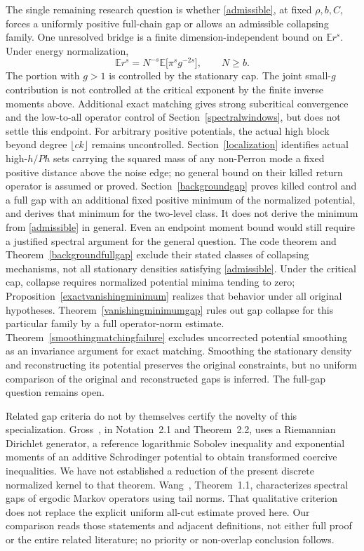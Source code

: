 \documentclass[11pt]{article}
\newcommand{\E}{\mathbb E}
\begin{document}
The single remaining research question is whether \eqref{admissible}, at fixed $\rho,b,C$, forces a uniformly positive full-chain gap or allows an admissible collapsing family. One unresolved bridge is a finite dimension-independent bound on $\E r^s$. Under energy normalization,
\[
 \E r^s=N^{-s}\E\bigl[\pi^s g^{-2s}\bigr],\qquad N\geq b.
\]
The portion with $g>1$ is controlled by the stationary cap. The joint small-$g$ contribution is not controlled at the critical exponent by the finite inverse moments above. Additional exact matching gives strong subcritical convergence and the low-to-all operator control of Section~\ref{spectralwindows}, but does not settle this endpoint. For arbitrary positive potentials, the actual high block beyond degree $\lfloor ck\rfloor$ remains uncontrolled. Section~\ref{localization} identifies actual high-$h/Ph$ sets carrying the squared mass of any non-Perron mode a fixed positive distance above the noise edge; no general bound on their killed return operator is assumed or proved. Section~\ref{backgroundgap} proves killed control and a full gap with an additional fixed positive minimum of the normalized potential, and derives that minimum for the two-level class. It does not derive the minimum from \eqref{admissible} in general. Even an endpoint moment bound would still require a justified spectral argument for the general question. The code theorem and Theorem~\ref{backgroundfullgap} exclude their stated classes of collapsing mechanisms, not all stationary densities satisfying \eqref{admissible}. Under the critical cap, collapse requires normalized potential minima tending to zero; Proposition~\ref{exactvanishingminimum} realizes that behavior under all original hypotheses. Theorem~\ref{vanishingminimumgap} rules out gap collapse for this particular family by a full operator-norm estimate. Theorem~\ref{smoothingmatchingfailure} excludes uncorrected potential smoothing as an invariance argument for exact matching. Smoothing the stationary density and reconstructing its potential preserves the original constraints, but no uniform comparison of the original and reconstructed gaps is inferred. The full-gap question remains open.

Related gap criteria do not by themselves certify the novelty of this
specialization. Gross~\cite{gross2025}, in Notation~2.1 and Theorem~2.2,
uses a Riemannian Dirichlet generator, a reference logarithmic Sobolev
inequality and exponential moments of an additive Schrodinger potential
to obtain transformed coercive inequalities. We have not established a
reduction of the present discrete normalized kernel to that theorem.
Wang~\cite{wang2013}, Theorem~1.1, characterizes spectral gaps of ergodic
Markov operators using tail norms. That qualitative criterion does not
replace the explicit uniform all-cut estimate proved here. Our comparison
reads those statements and adjacent definitions, not either full proof or
the entire related literature; no priority or non-overlap conclusion follows.
\end{document}
